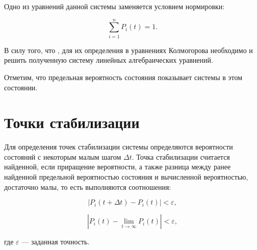 Одно из уравнений данной системы заменяется условием нормировки:

\begin{equation}
    \sum\limits_{i=1}^{n} P_i(t) = 1.
\end{equation}

В силу того, что , для их
определения в уравнениях Колмогорова необходимо  и решить полученную систему линейных алгебраических уравнений.

Отметим, что предельная вероятность состояния показывает  системы в этом состоянии.

\section{Точки стабилизации}

Для определения точек стабилизации системы определяются вероятности состояний с
некоторым малым шагом $\Delta t$. Точка стабилизации считается найденной, если
приращение вероятности, а также разница между ранее найденной предельной
вероятностью состояния и вычисленной вероятностью, достаточно малы, то есть
выполняются соотношения:

\begin{equation}
    |P_i(t + \Delta t) -  P_i(t)| < \varepsilon,
\end{equation}

\begin{equation}
    |P_i(t) -  \lim_{t \rightarrow \infty} P_i(t)| < \varepsilon,
\end{equation}

где $\varepsilon$ --- заданная точность.
